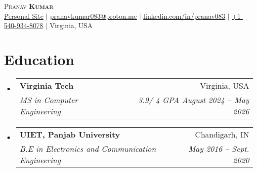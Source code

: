 \documentclass[letterpaper,11pt]{article}
\makeatletter
\newcommand{\resumeSubheading}[4]{
  \vspace{-2pt}\item
    \begin{tabular*}{0.97\textwidth}[t]{l@{\extracolsep{\fill}}r}
      \textbf{#1} & #2 \\
      \textit{\small#3} & \textit{\small #4} \\
    \end{tabular*}\vspace{-9pt}
}
\newcommand{\resumeSubHeadingListStart}{\begin{itemize}[leftmargin=0.15in, label={}]}
\newcommand{\resumeSubHeadingListEnd}{\end{itemize}}
\makeatother
\begin{document}

\begin{center}
    {\Huge \scshape Pranav \textbf{Kumar}} \\ \vspace{1pt}
    \href{https://pranav083.github.io/}{\underline{Personal-Site}} $|$
    \href{mailto:pranavkumar083@proton.me}{\underline{pranavkumar083@proton.me}} $|$
    \href{https://linkedin.com/in/pranav083}{\underline{linkedin.com/in/pranav083}} $|$
    \small{\underline{+1-540-934-8078}} $|$
    \small{ Virginia, USA}   
\end{center}\vspace{-20pt}

\section{Education}
  \resumeSubHeadingListStart
    \resumeSubheading
      {Virginia Tech}{Virginia, USA}
      {MS in Computer Engineering }{3.9/ 4 GPA August 2024 -- May 2026}

    \resumeSubheading
      {UIET, Panjab University}{Chandigarh, IN}
      {B.E in Electronics and Communication Engineering }{ May 2016 -- Sept. 2020}

  \resumeSubHeadingListEnd


\end{document}
